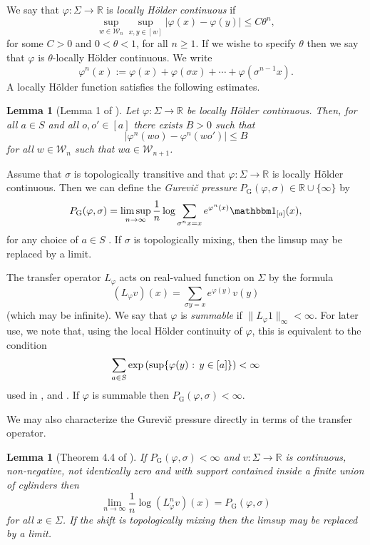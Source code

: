 \documentclass[11pt,letterpaper]{amsart}
\newtheorem{lemma}[theorem]{Lemma}
\theoremstyle{definition}
\numberwithin{equation}{section}
\numberwithin{theorem}{section}
\def\R{\mathbb{R}}
\def\vp{\varphi}
\def\L{L_\varphi}
\def\R{\mathbb R}
\def\W{\mathcal W}
\def\PG{P_{\mathrm{G}}}
\begin{document}
We say that $\vp : \Sigma \to \R$ is \emph{locally H\"older continuous} if
\[
\sup_{w \in \W_n} \sup_{x,y \in [w]} |\vp(x)-\vp(y)| \le C\theta^n,
\]
for some $C>0$ and $0<\theta<1$, for all $n \ge 1$.
If we wishe to specify $\theta$ then we say that $\vp$ is
$\theta$-locally H\"older continuous.
We write
\[
\vp^n(x) := \vp(x) +\vp(\sigma x) + \cdots + \vp(\sigma^{n-1}x).
\]
A locally H\"older function satisfies the following estimates.

\begin{lemma}[Lemma 1 of \cite{Sarig-etds}]\label{lem:bounded_variation}
Let $\vp : \Sigma \to \mathbb R$ be locally H\"older continuous.
Then, for all $a \in S$ and all $o,o' \in [a]$ there exists $B>0$ such that
\[
|\vp^n(wo)-\vp^n(wo')| \le B
\]
for all $w \in \mathcal W_n$ such that $wa \in \mathcal W_{n+1}$.
\end{lemma}

Assume that $\sigma$ is topologically transitive and that
$\vp : \Sigma \to \R$ is locally H\"older continuous. Then we can define the \emph{Gurevi\v{c} pressure}
$\PG(\vp,\sigma) \in \mathbb R \cup\{\infty\}$ by
\[
\PG(\vp,\sigma) = \limsup_{n \to \infty} \frac{1}{n} \log \sum_{\sigma^nx=x} e^{\vp^n(x)} \mathbbm 1_{[a]}(x),
\]
for any choice of  $a \in S$ \cite{Sarig-etds}.
If $\sigma$ is topologically mixing, then the limsup may be replaced by a limit. 

The transfer operator $\L$ acts on real-valued function on $\Sigma$ by the formula
\[
(\L v)(x) = \sum_{\sigma y=x} e^{\vp(y)} v(y)
\]
(which may be infinite).
We say that $\vp$ is \emph{summable}
if $\|L_\vp 1\|_\infty<\infty$. 
For later use, we note that, using the local H\"older continuity of $\vp$, this is equivalent to the condition
\[
\sum_{a \in S} \exp\left(\sup\{\vp(y) \hbox{ : } y \in [a]\}\right)<\infty
\]
used in \cite{KK}, \cite{MU2001} and \cite{MU2003}.
If $\vp$ is summable then $\PG(\vp,\sigma)<\infty$.






We may also characterize the Gurevi\v{c} pressure directly in terms of the transfer operator.

\begin{lemma}[Theorem 4.4 of \cite{Sarig-survey}]\label{lem:GP_from_transfer}
If $\PG(\vp,\sigma)<\infty$ and $v : \Sigma \to \mathbb R$ is continuous, non-negative, not identically zero 
and with support contained inside a finite union of cylinders then
\[
\lim_{n \to \infty} \frac{1}{n} \log (\L^n v)(x) =\PG(\vp,\sigma)
\]
for all $x \in \Sigma$.
If the shift is topologically mixing then the limsup may be replaced by a limit.
\end{lemma}
\end{document}
